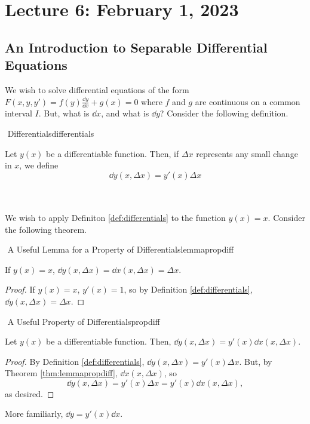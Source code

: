
\section{Lecture 6: February 1, 2023}

\subsection{An Introduction to Separable Differential Equations}

    We wish to solve differential equations of the form \(F(x,y,y')=f(y)\frac{\dd y}{\dd x}+g(x)=0\) where \(f\) and \(g\) are continuous on a common interval \(I\). But, what is \(\dd x\), and what is \(\dd y\)? Consider the following definition.
    \begin{definition}{\Stop\,\,Differentials}{differentials}

        Let \(y(x)\) be a differentiable function. Then, if \(\Delta x\) represents any small change in \(x\), we define
        \begin{equation*}
            \dd y(x,\Delta x)=y'(x)\Delta x
        \end{equation*}

    \end{definition}
    \vphantom
    \\
    \\
    We wish to apply Definiton \ref{def:differentials} to the function \(y(x)=x\). Consider the following theorem.
    \begin{theorem}{\Stop\,\,A Useful Lemma for a Property of Differentials}{lemmapropdiff}
        
        If \(y(x)=x\), \(\dd y(x,\Delta x)=\dd x(x,\Delta x)=\Delta x\).
        \begin{proof}
            If \(y(x)=x\), \(y'(x)=1\), so by Definition \ref{def:differentials}, \(\dd y(x,\Delta x)=\Delta x\).
        \end{proof}

    \end{theorem}
    \pagebreak
    \begin{theorem}{\Stop\,\,A Useful Property of Differentials}{propdiff}

        Let \(y(x)\) be a differentiable function. Then, \(\dd y(x,\Delta x)=y'(x)\dd x(x,\Delta x)\).
        \begin{proof}
            By Definition \ref{def:differentials}, \(\dd y(x,\Delta x)=y'(x)\Delta x\). But, by Theorem \ref{thm:lemmapropdiff}, \(\dd x(x,\Delta x)\), so
            \begin{equation*}
                \dd y(x, \Delta x)=y'(x)\Delta x=y'(x)\dd x(x,\Delta x),
            \end{equation*}
            as desired.
        \end{proof}
        More familiarly, \(\dd y=y'(x)\dd x\).
    \end{theorem}

